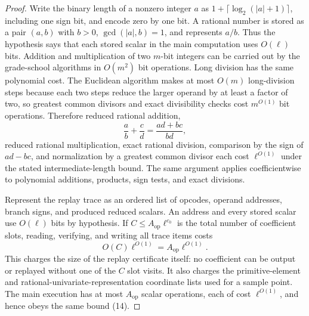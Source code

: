 \documentclass{article}
\begin{document}
\begin{proof}
Write the binary length of a nonzero integer \(a\) as \(1+\lceil\log_2(|a|+1)\rceil\), including one sign bit, and encode zero by one bit.  A rational number is stored as a pair \((a,b)\) with \(b>0\), \(\gcd(|a|,b)=1\), and represents \(a/b\).  Thus the hypothesis says that each stored scalar in the main computation uses \(O(\ell)\) bits.  Addition and multiplication of two \(m\)-bit integers can be carried out by the grade-school algorithms in \(O(m^2)\) bit operations.  Long division has the same polynomial cost.  The Euclidean algorithm makes at most \(O(m)\) long-division steps because each two steps reduce the larger operand by at least a factor of two, so greatest common divisors and exact divisibility checks cost \(m^{O(1)}\) bit operations.  Therefore reduced rational addition,
\[
\frac ab+\frac cd=\frac{ad+bc}{bd},
\]
reduced rational multiplication, exact rational division, comparison by the sign of \(ad-bc\), and normalization by a greatest common divisor each cost \(\ell^{O(1)}\) under the stated intermediate-length bound.  The same argument applies coefficientwise to polynomial additions, products, sign tests, and exact divisions.

Represent the replay trace as an ordered list of opcodes, operand addresses, branch signs, and produced reduced scalars.  An address and every stored scalar use \(O(\ell)\) bits by hypothesis.  If \(C\le A_{\mathrm{op}}\ell^{c_0}\) is the total number of coefficient slots, reading, verifying, and writing all trace items costs
\[
O(C)\ell^{O(1)}=A_{\mathrm{op}}\ell^{O(1)}.
\tag{14}
\]
This charges the size of the replay certificate itself: no coefficient can be output or replayed without one of the \(C\) slot visits.  It also charges the primitive-element and rational-univariate-representation coordinate lists used for a sample point.  The main execution has at most \(A_{\mathrm{op}}\) scalar operations, each of cost \(\ell^{O(1)}\), and hence obeys the same bound (14).


\end{proof}
\end{document}
